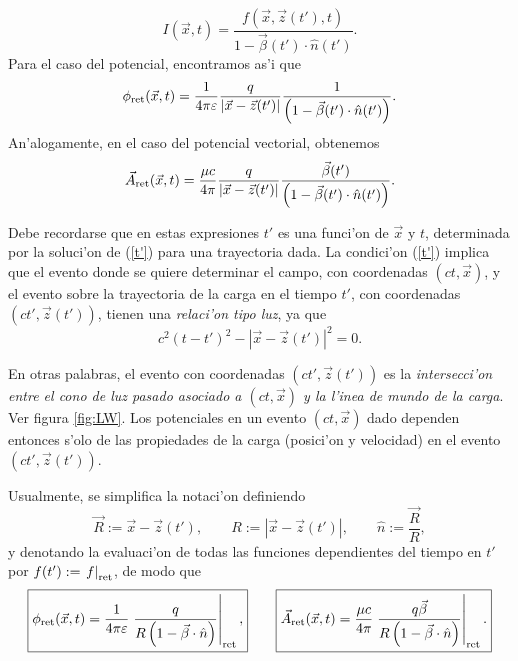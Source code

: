 \begin{equation}
 I(\vec{x},t)=\frac{f(\vec{x},\vec{z}(t'),t)}{1-\vec{\beta}(t')\cdot\hat{n}(t')}. \label{Ir2}
\end{equation}
Para el caso del potencial, encontramos as'i que
\begin{equation}
\phi_{\rm ret}(\vec{x},t)=\frac{1}{4\pi\varepsilon}\frac{q}{\left|\vec{x}-\vec{z}(t')\right|}\frac{1}{\left( 1-\vec\beta(t')\cdot\hat{n}(t')\right) }.
 \end{equation}
An'alogamente, en el caso del potencial vectorial, obtenemos
\begin{equation}
\vec{A}_{\rm ret}(\vec{x},t)=\frac{\mu c}{4\pi}\frac{q}{\left|\vec{x}-\vec{z}(t')\right|}
\frac{\vec{\beta}(t')}{\left( 1-\vec\beta(t')\cdot\hat{n}(t')\right) }.
 \end{equation}
 
Debe recordarse que en estas expresiones $t'$ es una funci'on de $\vec{x}$ y $t$, determinada por la soluci'on de (\ref{t'}) para una trayectoria dada. La condici'on (\ref{t'}) implica que el evento donde se quiere determinar el campo, con coordenadas $(ct,\vec{x})$, y el evento sobre la trayectoria de la carga en el tiempo $t'$, con coordenadas $(ct',\vec{z}(t'))$, tienen una \textit{relaci'on tipo luz}, ya que
\begin{equation}
 c^2(t-t')^2-|\vec{x}-\vec{z}(t')|^2=0.
\end{equation}

En otras palabras, el evento con coordenadas $(ct',\vec{z}(t'))$ es la \textit{intersecci'on entre el cono de luz pasado asociado a $(ct,\vec{x})$ y la l'inea de mundo de la carga}. Ver figura \ref{fig:LW}. Los potenciales en un evento $(ct,\vec{x})$ dado dependen entonces s'olo de las propiedades de la carga (posici'on y velocidad) en el evento $(ct',\vec{z}(t'))$.

Usualmente, se simplifica la notaci'on definiendo
\begin{equation}
 \vec{R}:=\vec{x}-\vec{z}(t'), \qquad R:=\left|\vec{x}-\vec{z}(t')\right|, \qquad \hat{n}:=\frac{\vec{R}}{R}, \label{defR}
\end{equation}
y denotando la evaluaci'on de todas las funciones dependientes del tiempo en $t'$ por $f(t'):=\left.f\right|_{\rm ret}$, de modo que
\begin{equation}
\boxed{\phi_{\rm ret}(\vec{x},t)=\frac{1}{4\pi\varepsilon}\left. \frac{q}{ R\left(
1-\vec{\beta}\cdot\hat{n}\right) }\right|_{\rm ret}, } \qquad
\boxed{\vec{A}_{\rm ret}(\vec{x},t)=\frac{\mu c}{4\pi}\left. \frac{q\vec{\beta}}{ R\left(1-\vec{\beta}\cdot\hat{n}\right) }\right|_{\rm ret}.} \label{potretq}
\end{equation}

